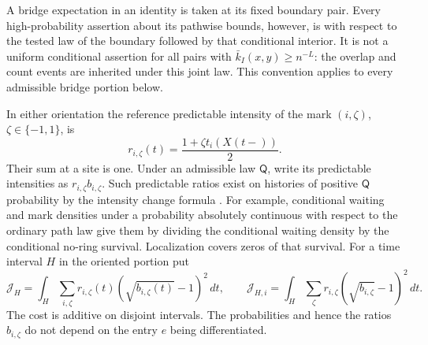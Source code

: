 A bridge expectation in an identity is taken at its fixed boundary pair.
Every high-probability assertion about its pathwise bounds, however, is
with respect to the tested law of the boundary followed by that conditional
interior.  It is not a uniform conditional assertion for all pairs with
$\bar k_I(x,y)\ge n^{-L}$: the overlap and count events are inherited under
this joint law.  This convention applies to every admissible bridge portion
below.

In either orientation the reference predictable intensity of the mark
$(i,\zeta)$, $\zeta\in\{-1,1\}$, is
\begin{equation}\label{score:reference-rates}
 r_{i,\zeta}(t)=\frac{1+\zeta t_i(X(t-))}{2}.
\end{equation}
Their sum at a site is one.  Under an admissible law $\mathsf Q$, write its
predictable intensities as $r_{i,\zeta}b_{i,\zeta}$.  Such predictable
ratios exist on histories of positive $\mathsf Q$ probability by the
intensity change formula \cite[Theorem~4.1]{Jacod1975}.  For example,
conditional waiting and mark densities under a probability absolutely
continuous with respect to the ordinary path law give them by dividing
the conditional waiting density by the conditional no-ring survival.
Localization covers zeros of that survival.  For a time interval $H$ in
the oriented portion put
\begin{equation}\label{score:hellinger-cost}
 \mathcal J_H=\int_H\sum_{i,\zeta}r_{i,\zeta}(t)
                    (\sqrt{b_{i,\zeta}(t)}-1)^2\,dt,
 \qquad
 \mathcal J_{H,i}=\int_H\sum_\zeta r_{i,\zeta}
                    (\sqrt{b_{i,\zeta}}-1)^2\,dt.
\end{equation}
The cost is additive on disjoint intervals.  The probabilities and hence
the ratios $b_{i,\zeta}$ do not depend on the entry $e$ being differentiated.

